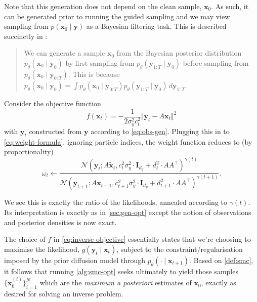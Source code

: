 Note that this generation does not depend on the clean sample, $\mathbf{x}_0$. As such,
it can be generated prior to running the guided sampling and we may view sampling from
$p(\mathbf{x}_0 \mid \mathbf{y})$ as a Bayesian filtering task. This is described succinctly in
\textcite{douDiffusionPosteriorSampling2023}:
\begin{quote}
    We can generate a sample $\mathbf{x}_0$ from the Bayesian posterior distribution
    $p_\theta(\mathbf{x}_0 \mid \mathbf{y}_0)$ by first sampling from
    $p_\theta(\mathbf{y}_{1:T} \mid \mathbf{y}_0)$ before sampling from
    $p_\theta(\mathbf{x}_0 \mid \mathbf{y}_{0:T})$. This is because
    $p_\theta(\mathbf{x}_0 \mid \mathbf{y}_0) = \int p_\theta(\mathbf{x}_0 \mid \mathbf{y}_{0:T})p_\theta(\mathbf{y}_{1:T} \mid \mathbf{y}_0)\, d\mathbf{y}_{1:T}$.
\end{quote}

\begin{proposition}
    Consider the objective function
    \begin{equation}
        f(\mathbf{x}_t) = -\frac{1}{2\sigma_y^2c_t^2}\Vert\mathbf{y}_t - A\mathbf{x}_t\Vert^2 \label{eq:inverse-objective}
    \end{equation}
    with $\mathbf{y}_t$ constructed from $\mathbf{y}$ according to \autoref{eq:obs-gen}.
    Plugging this in to \autoref{eq:weight-formula}, ignoring particle indices, the weight function
    reduces to (by proportionality)
    \begin{equation}
        \omega_t \gets \frac{\mathcal{N}(\mathbf{y}_t; A\tilde{\mathbf{x}}_t, c_t^2\sigma_y^2\cdot \mathbf{I}_{d_y} + d_t^2\cdot AA^\top)^{\gamma(t)}}{\mathcal{N}(\mathbf{y}_{t+1}; A\mathbf{x}_{t+1}, c_{t+1}^2\sigma_y^2\cdot \mathbf{I}_{d_y} + d_{t+1}^2\cdot AA^\top)^{\gamma(t+1)}}. \label{eq:weight-formula-inverse}
    \end{equation}
\end{proposition}

We see this is exactly the ratio of the likelihoods, annealed according to $\gamma(t)$. Its
interpretation is exactly as in \autoref{sec:gen-opt} except the notion of observations and posterior
densities is now exact.

\begin{remark}[MAP]
    The choice of $f$ in \autoref{eq:inverse-objective} essentially states that
    we're choosing to maximise the likelihood, $g(\mathbf{y}_t \mid \mathbf{x}_t)$, subject to the
    constraint/regularisation imposed by the prior diffusion model through
    $p_\theta(\cdot \mid \mathbf{x}_{t+1})$. Based on \ref{def:smc}, it follows that running
    \autoref{alg:smc-opt} seeks ultimately to yield those samples $\{\mathbf{x}_0^{(i)}\}_{i=1}^N$
    which are the \emph{maximum a posteriori} estimates of $\mathbf{x}_0$, exactly as desired for
    solving an inverse problem.
\end{remark}

